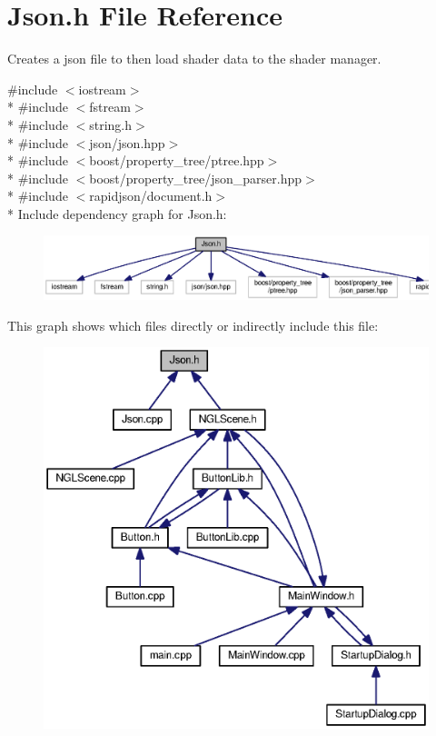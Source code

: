 \section{Json.\-h File Reference}
\label{_json_8h}


Creates a json file to then load shader data to the shader manager.  


{\ttfamily \#include $<$iostream$>$}\\*
{\ttfamily \#include $<$fstream$>$}\\*
{\ttfamily \#include $<$string.\-h$>$}\\*
{\ttfamily \#include $<$json/json.\-hpp$>$}\\*
{\ttfamily \#include $<$boost/property\-\_\-tree/ptree.\-hpp$>$}\\*
{\ttfamily \#include $<$boost/property\-\_\-tree/json\-\_\-parser.\-hpp$>$}\\*
{\ttfamily \#include $<$rapidjson/document.\-h$>$}\\*
Include dependency graph for Json.\-h\-:\nopagebreak
\begin{figure}[H]
\begin{center}
\leavevmode
\includegraphics[width=350pt]{_json_8h__incl}
\end{center}
\end{figure}
This graph shows which files directly or indirectly include this file\-:
\nopagebreak
\begin{figure}[H]
\begin{center}
\leavevmode
\includegraphics[width=350pt]{_json_8h__dep__incl}
\end{center}
\end{figure}
